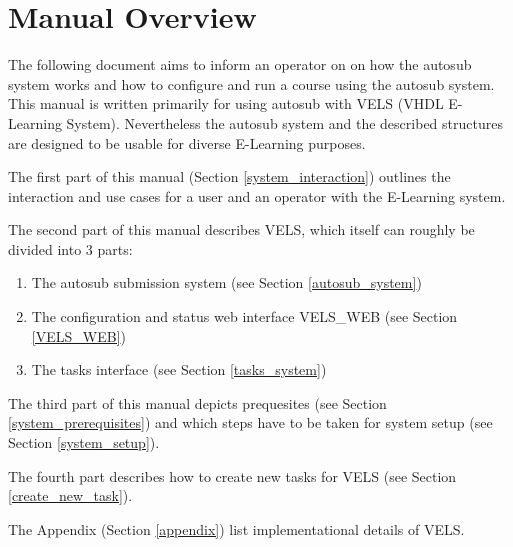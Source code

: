 \section{Manual Overview} \label{overview}

The following document aims to inform an operator on on how the autosub system works
and how to configure and run a course using the autosub system. This manual is written
primarily for using autosub with VELS (VHDL E-Learning System). Nevertheless the autosub
system and the described structures are designed to be usable for diverse E-Learning
purposes.

The first part of this manual (Section \ref{system_interaction}) outlines the
interaction and use cases for a user and an operator with the E-Learning system.

The second part of this manual describes VELS, which itself can roughly be divided
into 3 parts:
\begin{enumerate}
    \item The autosub submission system (see Section \ref{autosub_system})
    \item The configuration and status web interface VELS\_WEB (see Section
	      \ref{VELS_WEB})
    \item The tasks interface (see Section \ref{tasks_system})
\end{enumerate}

The third part of this manual depicts prequesites (see Section \ref{system_prerequisites})
and which steps have to be taken for system setup (see Section \ref{system_setup}).

The fourth part describes how to create new tasks for VELS (see Section \ref{create_new_task}).

The Appendix (Section \ref{appendix}) list implementational details of VELS.
